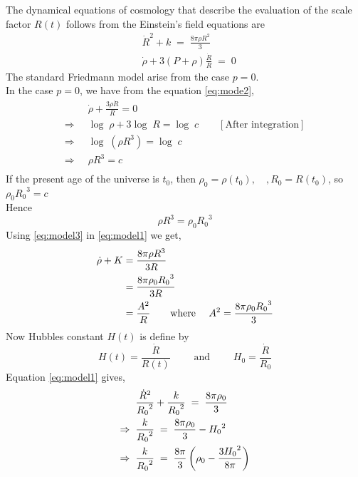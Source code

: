 \documentclass[../main-sheet.tex]{subfiles}
\begin{document}
\begin{soln}
    The dynamical equations of cosmology that describe the evaluation of the scale factor \(R(t)\) follows from the Einstein's field equations are
    \begin{align}
        &\dot{R}^2+k\;=\;\frac{8\pi\rho R^2}{3}\label{eq:model1}\\
        &\dot{\rho}+3(P+\rho)\frac{\dot{R }}{R }\;=\;0\label{eq:model2}
    \end{align}
The standard Friedmann model arise from the case \(p = 0\).\\
In the case \(p = 0\), we have from the equation \eqref{eq:mode2},
\begin{align*}
    &\dot{\rho}+\frac{3\rho \dot{R }}{R }=0\\
    \Rightarrow\;\;&\log\;\rho+3\log\;{R }=\log\;c \qquad[\text{After integration}]\\
    \Rightarrow\;\;&\log\;\left(\rho{R }^3\right)=\log\;c\\
    \Rightarrow\;\;&\rho{R }^3=c\\
\end{align*}
If the present age of the universe is \(t_0\), then
\(\rho_0=\rho(t_0),\quad, R_0=R(t_0)\), so \(\rho_0 {R_0}^3=c\)\\
Hence
\begin{equation}
    \rho{R }^3=\rho_0 {R_0}^3 \label{eq:model3}
\end{equation}
Using \eqref{eq:model3} in \eqref{eq:model1} we get,
\begin{align}
    \dot{\rho}+K&=\frac{8\pi\rho R^3}{3R}\notag\\
    &=\frac{8\pi\rho_0 {R_0}^3}{3R}\notag\\
    &=\frac{A^2 }{R }\qquad\text{where   }\quad A^2=\frac{8\pi\rho_0 {R_0}^3}{3}\label{eq:model4}
\end{align}
Now Hubbles constant \(H(t)\) is define by
\begin{equation}
    H(t)=\frac{\dot{R }}{R(t )}\qquad\text{ and }\qquad H_0=\frac{\dot{R }}{R_0}\label{eq:model5}
\end{equation}
Equation \eqref{eq:model1} gives,
\begin{align}
    &\frac{\dot{R}^2}{{R_0}^2}+\frac{k}{{R_0}^2}\;=\;\frac{8\pi\rho_0 }{3}\notag\\
    \Rightarrow\;\;& \frac{k}{{R_0}^2}\;=\;\frac{8\pi\rho_0 }{3}-{H_0}^2\notag\\
    \Rightarrow\;\;& \frac{k}{{R_0}^2}\;=\;\frac{8\pi}{3}\left( \rho_0-\frac{3{H_0}^2}{8\pi} \right)\notag\\

\end{align}
\end{soln}
\end{document}
